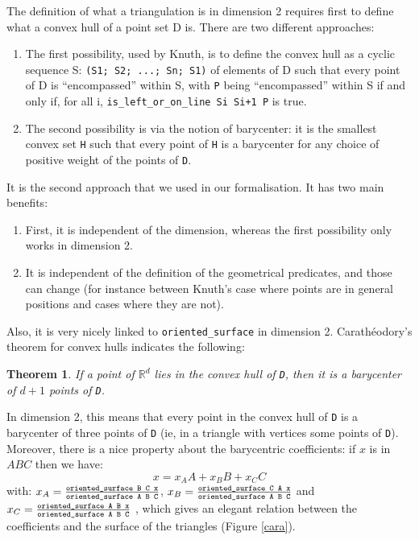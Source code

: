 \documentclass[a4paper,10pt]{article}
\newtheorem{theorem}{Theorem}
\begin{document}
The definition of what a triangulation is in dimension 2 requires first to define what a convex hull of a point set D is.
There are two different approaches:
\begin{enumerate}
\item The first possibility, used by Knuth,  is to define the convex hull as a cyclic sequence S: {\tt (S1; S2; ...; Sn; S1)} of elements of D such that every point of D is ``encompassed'' within S, with {\tt P} being ``encompassed'' within S if and only if, for all i,  {\tt is\_left\_or\_on\_line Si Si+1 P} is true.

\item The second possibility is via the notion of barycenter: it is the smallest convex set {\tt H} such that every point of {\tt H} is a barycenter for any choice of positive weight of the points of {\tt D}.
\end{enumerate}

It is the second approach that we used in our formalisation. It has two main benefits:
\begin{enumerate}
\item First, it is independent of the dimension, whereas the first possibility only works in dimension 2.
\item It is independent of the definition of the geometrical predicates, and those can change (for instance between Knuth's case where points are in general positions and cases where they are not). 
\end{enumerate}
Also, it is very nicely linked to {\tt oriented\_surface} in dimension 2. Carathéodory's theorem for convex hulls indicates the following:
\begin{theorem}
If a point of $\mathbb{R}^d$ lies in the convex hull of {\tt D}, then it is a barycenter of $d+1$ points of {\tt D}.
\end{theorem}
In dimension 2, this means that every point in the convex hull of {\tt D} is a barycenter of three points of {\tt D} (ie, in a triangle with vertices some points of {\tt D}).
Moreover, there is a nice property about the barycentric coefficients: if $x$ is in $ABC$ then we have:
$$x = x_AA + x_BB + x_CC$$
with: $x_A =\frac{ \text{\tt oriented\_surface B C x}}{\text{\tt oriented\_surface A B C}}$,
$x_B =\frac{ \text{\tt oriented\_surface C A x}}{\text{\tt oriented\_surface A B C}}$ and
$x_C =\frac{ \text{\tt oriented\_surface A B x}}{\text{\tt oriented\_surface A B C}}$
, which gives an elegant relation between the coefficients and the surface of the triangles (Figure \ref{cara}).
\end{document}
